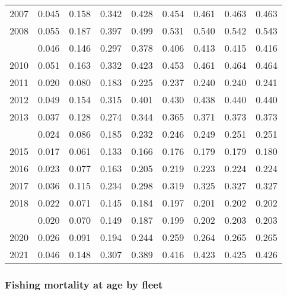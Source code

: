 \documentclass[
]{article}
\begin{document}
\begin{longtable}[t]{lrrrrrrrr}
2007 & 0.045 & 0.158 & 0.342 & 0.428 & 0.454 & 0.461 & 0.463 & 0.463\\
2008 & 0.055 & 0.187 & 0.397 & 0.499 & 0.531 & 0.540 & 0.542 & 0.543\\
\addlinespace
2009 & 0.046 & 0.146 & 0.297 & 0.378 & 0.406 & 0.413 & 0.415 & 0.416\\
2010 & 0.051 & 0.163 & 0.332 & 0.423 & 0.453 & 0.461 & 0.464 & 0.464\\
2011 & 0.020 & 0.080 & 0.183 & 0.225 & 0.237 & 0.240 & 0.240 & 0.241\\
2012 & 0.049 & 0.154 & 0.315 & 0.401 & 0.430 & 0.438 & 0.440 & 0.440\\
2013 & 0.037 & 0.128 & 0.274 & 0.344 & 0.365 & 0.371 & 0.373 & 0.373\\
\addlinespace
2014 & 0.024 & 0.086 & 0.185 & 0.232 & 0.246 & 0.249 & 0.251 & 0.251\\
2015 & 0.017 & 0.061 & 0.133 & 0.166 & 0.176 & 0.179 & 0.179 & 0.180\\
2016 & 0.023 & 0.077 & 0.163 & 0.205 & 0.219 & 0.223 & 0.224 & 0.224\\
2017 & 0.036 & 0.115 & 0.234 & 0.298 & 0.319 & 0.325 & 0.327 & 0.327\\
2018 & 0.022 & 0.071 & 0.145 & 0.184 & 0.197 & 0.201 & 0.202 & 0.202\\
\addlinespace
2019 & 0.020 & 0.070 & 0.149 & 0.187 & 0.199 & 0.202 & 0.203 & 0.203\\
2020 & 0.026 & 0.091 & 0.194 & 0.244 & 0.259 & 0.264 & 0.265 & 0.265\\
2021 & 0.046 & 0.148 & 0.307 & 0.389 & 0.416 & 0.423 & 0.425 & 0.426\\*
\end{longtable}

\hypertarget{fishing-mortality-at-age-by-fleet}{%
\subsubsection{Fishing mortality at age by
fleet}\label{fishing-mortality-at-age-by-fleet}}
\end{document}
